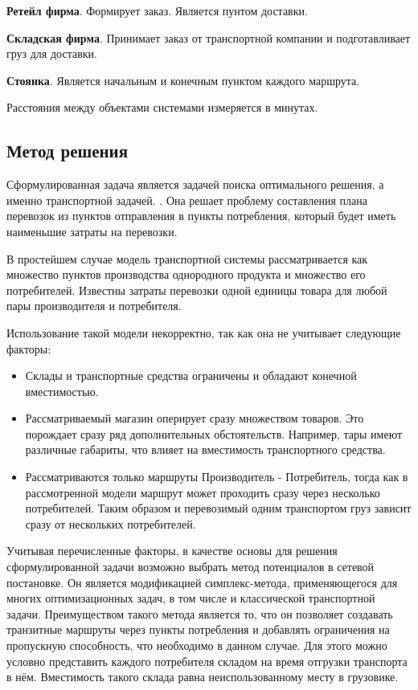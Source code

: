 	\textbf{Ретейл фирма}. Формирует заказ. Является пунтом доставки.
	
	\textbf{Складская фирма}. Принимает заказ от транспортной компании и подготавливает груз для доставки.
	
	\textbf{Стоянка}. Является начальным и конечным пунктом каждого маршрута.
	
	Расстояния между объектами системами измеряется в минутах.

\subsection{Метод решения}
	Сформулированная задача является задачей поиска оптимального решения, а именно транспортной задачей. \cite{trans:main}. Она решает проблему составления плана перевозок из пунктов отправления в пункты потребления, который будет иметь наименьшие затраты на перевозки. 
	
	В простейшем случае модель транспортной системы рассматривается как множество пунктов производства однородного продукта и множество его потребителей. Известны затраты перевозки одной единицы товара для любой пары производителя и потребителя.
	
	Использование такой модели некорректно, так как она не учитывает следующие факторы:
	\begin{itemize}
		\item Склады и транспортные средства ограничены и обладают конечной вместимостью.
		\item Рассматриваемый магазин оперирует сразу множеством товаров. Это порождает сразу ряд дополнительных обстоятельств. Например, тары имеют различные габариты, что влияет на вместимость транспортного средства.
		\item Рассматриваются только маршруты Производитель - Потребитель, тогда как в рассмотренной модели маршрут может проходить сразу через несколько потребителей. Таким образом и перевозимый одним транспортом груз зависит сразу от нескольких потребителей.
	\end{itemize}
	
	Учитывая перечисленные факторы, в качестве основы для решения сформулированной задачи возможно выбрать метод потенциалов в сетевой постановке. Он является модификацией симплекс-метода, применяющегося для многих оптимизационных задач, в том числе и классической транспортной задачи. 
	Преимуществом такого метода является то, что он позволяет создавать транзитные маршруты через пункты потребления и добавлять ограничения на пропускную способность, что необходимо в данном случае. Для этого можно условно представить каждого потребителя складом на время отгрузки транспорта в нём. Вместимость такого склада равна неиспользованному месту в грузовике.
	
